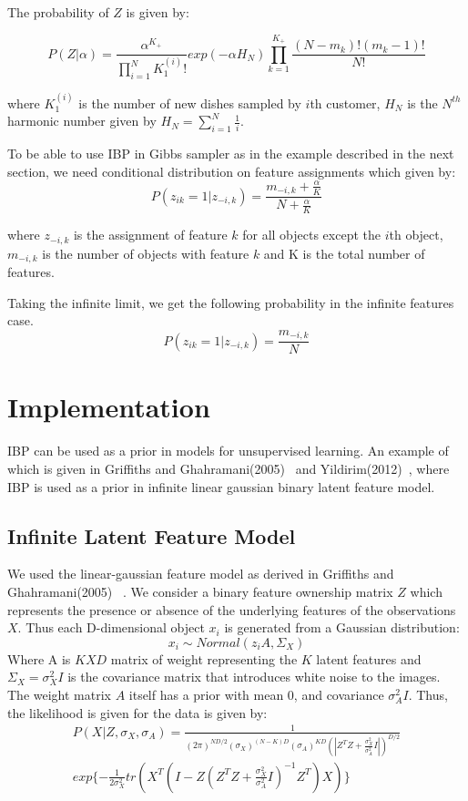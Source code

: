 \documentclass{article}
\begin{document}
The probability of $Z$ is given by:

\begin{equation}
P(Z|\alpha) =\frac{\alpha^{K_+}}{\prod_{i=1}^{N}K_1^{(i)}!}exp(-\alpha H_N)\prod_{k=1}^{K_+}\frac{(N-m_k)!(m_k-1)!}{N!} 
\end{equation}

where $K_1^{(i)}$ is the number of new dishes sampled by $i$th customer, $H_N$ is the $N^{th}$ harmonic number given by $H_N=\sum_{i=1}^{N} \frac{1}{i}$.

To be able to use IBP in Gibbs sampler as in the example described in the next section, we need conditional distribution on feature assignments which given by:
\begin{equation}\label{eq:zprob}
P(z_{ik}=1|z_{-i,k}) = \frac{m_{-i,k}+\frac{\alpha}{K}}{N+\frac{\alpha}{K}}
\end{equation}

where $z_{-i,k}$ is the assignment of feature $k$ for all objects except the $i$th object, $m_{-i,k}$ is the number of objects with feature $k$ and K is the total number of features.

Taking the infinite limit, we get the following probability in the infinite features case.
\begin{equation}
P(z_{ik}=1|z_{-i,k}) = \frac{m_{-i,k}}{N}
\end{equation}

\section{Implementation}
IBP can be used as a prior in models for unsupervised learning. An example of which is given in Griffiths and Ghahramani(2005)~\cite{griffiths} and Yildirim(2012)~\cite{yildirim}, where IBP is used as a prior in infinite linear gaussian binary latent feature model.

\subsection{Infinite Latent Feature Model}
We used the linear-gaussian feature model as derived in Griffiths and Ghahramani(2005) ~\cite{griffiths}. We consider a binary feature ownership matrix $Z$ which represents the presence or absence of the underlying features of the observations $X$. Thus each D-dimensional object $x_i$ is generated from a Gaussian distribution:
\[
x_i \sim Normal(z_iA, \Sigma_X)
\]
Where A is $KXD$ matrix of weight representing the $K$ latent features and $\Sigma_X= \sigma^2_XI$ is the covariance matrix that introduces white noise to the images. The weight matrix $A$ itself has a prior with mean 0, and covariance $\sigma^2_AI$. Thus, the likelihood is given for the data is given by:
\begin{multline}\label{eq:lik}
P(X|Z,\sigma_X, \sigma_A) = \frac{1}{(2 \pi)^{ND/2} (\sigma_X)^{(N-K)D}(\sigma_A)^{KD}(|Z^TZ+\frac{\sigma_X^2}{\sigma_A^2}I|)^{D/2}}\\
exp\{-\frac{1}{2\sigma_X^2}tr(X^T(I-Z(Z^TZ+\frac{\sigma_X^2}{\sigma_A^2}I)^{-1}Z^T)X)\}
\end{multline}
\end{document}
